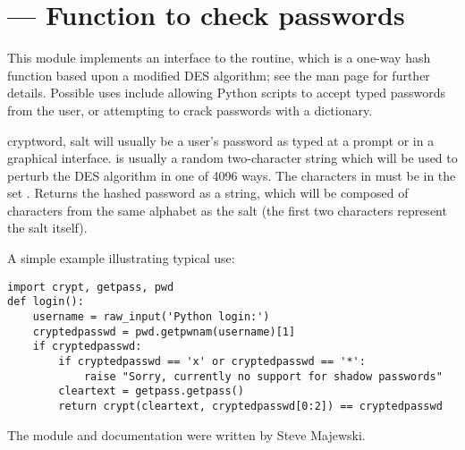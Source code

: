 \section{ ---
         Function to check \UNIX{} passwords}



This module implements an interface to the
 routine, which is a one-way hash
function based upon a modified DES algorithm; see
the \UNIX{} man page for further details.  Possible uses include
allowing Python scripts to accept typed passwords from the user, or
attempting to crack \UNIX{} passwords with a dictionary.

\begin{funcdesc}{crypt}{word, salt} 
 will usually be a user's password as typed at a prompt or
in a graphical interface.   is usually a random
two-character string which will be used to perturb the DES algorithm
in one of 4096 ways.  The characters in  must be in the set
\regexp{[./a-zA-Z0-9]}.  Returns the hashed password as a string,
which will be composed of characters from the same alphabet as the
salt (the first two characters represent the salt itself).
\end{funcdesc}


A simple example illustrating typical use:

\begin{verbatim}
import crypt, getpass, pwd
def login():
    username = raw_input('Python login:')
    cryptedpasswd = pwd.getpwnam(username)[1]
    if cryptedpasswd:
        if cryptedpasswd == 'x' or cryptedpasswd == '*': 
            raise "Sorry, currently no support for shadow passwords"
        cleartext = getpass.getpass()
        return crypt(cleartext, cryptedpasswd[0:2]) == cryptedpasswd
\end{verbatim}

The module and documentation were written by Steve Majewski.
